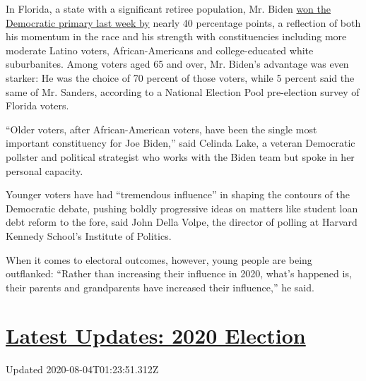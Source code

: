 In Florida, a state with a significant retiree population, Mr. Biden
\href{https://www.nytimes3xbfgragh.onion/interactive/2020/03/17/us/elections/results-florida-president-democrat-primary-election.html}{won
the Democratic primary last week by} nearly 40 percentage points, a
reflection of both his momentum in the race and his strength with
constituencies including more moderate Latino voters, African-Americans
and college-educated white suburbanites. Among voters aged 65 and over,
Mr. Biden's advantage was even starker: He was the choice of 70 percent
of those voters, while 5 percent said the same of Mr. Sanders, according
to a National Election Pool pre-election survey of Florida voters.

``Older voters, after African-American voters, have been the single most
important constituency for Joe Biden,'' said Celinda Lake, a veteran
Democratic pollster and political strategist who works with the Biden
team but spoke in her personal capacity.

Younger voters have had ``tremendous influence'' in shaping the contours
of the Democratic debate, pushing boldly progressive ideas on matters
like student loan debt reform to the fore, said John Della Volpe, the
director of polling at Harvard Kennedy School's Institute of Politics.

When it comes to electoral outcomes, however, young people are being
outflanked: ``Rather than increasing their influence in 2020, what's
happened is, their parents and grandparents have increased their
influence,'' he said.

\hypertarget{latest-updates-2020-election}{%
\section{\texorpdfstring{\href{https://www.nytimes3xbfgragh.onion/2020/08/03/us/elections/biden-vs-trump.html?action=click\&pgtype=Article\&state=default\&region=MAIN_CONTENT_1\&context=storylines_live_updates}{Latest
Updates: 2020
Election}}{Latest Updates: 2020 Election}}\label{latest-updates-2020-election}}

Updated 2020-08-04T01:23:51.312Z

